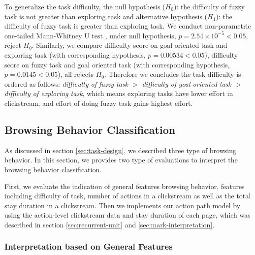 To generalize the task difficulty, the null hypothesis ($H_0$): the difficulty of fuzzy task is not greater
than exploring task and alternative hypothesis ($H_1$): the difficulty of fuzzy task is greater than
exploring task. We conduct non-parametric one-tailed Mann-Whitney U test \cite{mann1947test}, 
under null hypothesis, $p=2.54\times 10^{-5} < 0.05$, reject $H_0$.
Similarly, we compare difficulty score on goal oriented task and exploring task (with corresponding hypothesis, 
$p=0.00534 < 0.05$), difficulty score on fuzzy task and goal oriented task (with corresponding hypothesis, 
$p=0.0145 < 0.05$), all rejects $H_0$. Therefore we concludes the task difficulty is ordered
as follows: \emph{difficulty of fuzzy task $>$ difficulty of goal oriented task $>$ difficulty of exploring task},
which means exploring tasks have lower effort in clickstream, and effort of doing fuzzy task gains highest effort.

\subsection{Browsing Behavior Classification}

As discussed in section \ref{sec:task-design}, we described three type of browsing behavior. 
In this section, we provides two type of evaluations to interpret the browsing behavior classification.

First, we evaluate the indication of general features browsing behavior,
features including difficulty of task, number of actions in a clickstream as well as the total stay duration in a clickstream.
Then we implements our action path model by using the action-level clickstream data and stay duration of each page,
which was described in section \ref{sec:recurrent-unit} and \ref{sec:mark-interpretation}.

\subsubsection{Interpretation based on General Features}


